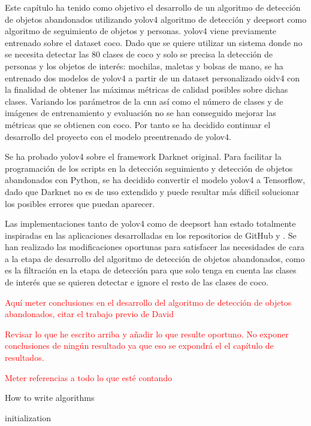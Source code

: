 Este capítulo ha tenido como objetivo el desarrollo de un algoritmo de detección de objetos abandonados utilizando \gls{yolov4} algoritmo de detección y \gls{deepsort} como algoritmo de seguimiento de objetos y personas. \gls{yolov4} viene previamente entrenado sobre el dataset \gls{coco}. Dado que se quiere utilizar un sistema donde no se necesita detectar las 80 clases de \gls{coco} y solo se precisa la detección de personas y los objetos de interés: mochilas, maletas y bolsas de mano, se ha entrenado dos modelos de \gls{yolov4} a partir de un dataset personalizado \gls{oidv4} con la finalidad de obtener las máximas métricas de calidad posibles sobre dichas clases. Variando los parámetros de la \gls{cnn} así como el número de clases y de imágenes de entrenamiento y evaluación no se han conseguido mejorar las métricas que se obtienen con \gls{coco}. Por tanto se ha decidido continuar el desarrollo del proyecto con el modelo preentrenado de \gls{yolov4}.

Se ha probado \gls{yolov4} sobre el framework Darknet original. Para facilitar la programación de los scripts en la detección seguimiento y detección de objetos abandonados con Python, se ha decidido convertir el modelo \gls{yolov4} a Tensorflow, dado que Darknet no es de uso extendido y puede resultar más díficil solucionar los posibles errores que puedan aparecer.

Las implementaciones tanto de \gls{yolov4} como de \gls{deepsort} han estado totalmente inspiradas en las aplicaciones desarrolladas en los repositorios de GitHub \cite{yolov4-tf-github-original} y \cite{yolov4-deepsort-original}. Se han realizado las modificaciones oportunas para satisfacer las necesidades de cara a la etapa de desarrollo del algoritmo de detección de objetos abandonados, como es la filtración en la etapa de detección para que solo tenga en cuenta las clases de interés que se quieren detectar e ignore el resto de las clases de \gls{coco}.

\textcolor{red}{Aquí meter conclusiones en el desarrollo del algoritmo de detección de objetos abandonados, citar el trabajo previo de David \cite{valdivieso2018}}

\textcolor{red}{Revisar lo que he escrito arriba y añadir lo que resulte oportuno. No exponer conclusiones de ningún resultado ya que eso se expondrá el el capítulo de resultados.}

\textcolor{red}{Meter referencias a todo lo que esté contando}



\begin{algorithm}[H]
 \caption{How to write algorithms}
 \label{alg:howto}
 initialization\;
\end{algorithm}
